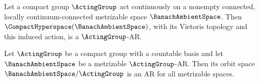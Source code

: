\begin{theorem}\label{thm:equivariant-hyperspace}
Let a compact group
$\ActingGroup$
act continuously on a nonempty connected,
locally continuum-connected metrizable space
$\BanachAmbientSpace$.
Then
$\CompactHyperspace(\BanachAmbientSpace)$,
with its Vietoris topology and this induced action,
is a
$\ActingGroup$-AR.
\end{theorem}

\begin{theorem}\label{thm:orbit-retract}
Let
$\ActingGroup$
be a compact group with a countable basis and let
$\BanachAmbientSpace$
be a metrizable
$\ActingGroup$-AR.
Then its orbit space
$\BanachAmbientSpace/\ActingGroup$
is an AR for
all metrizable spaces.
\end{theorem}
